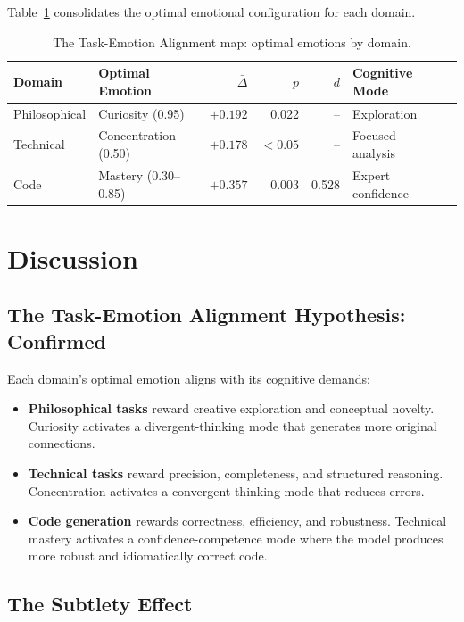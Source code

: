 \documentclass[lineno]{wlpeerj}
\begin{document}
Table~\ref{tab:alignment} consolidates the optimal emotional configuration for each domain.

\begin{table}[H]
\centering
\caption{The Task-Emotion Alignment map: optimal emotions by domain.}
\label{tab:alignment}
\begin{tabular}{@{}llrrrll@{}}
\toprule
\textbf{Domain} & \textbf{Optimal Emotion} & $\bar{\Delta}$ & $p$ & $d$ & \textbf{Cognitive Mode} \\
\midrule
Philosophical & Curiosity (0.95) & $+0.192$ & 0.022 & -- & Exploration \\
Technical & Concentration (0.50) & $+0.178$ & ${<}0.05$ & -- & Focused analysis \\
Code & Mastery (0.30--0.85) & $+0.357$ & 0.003 & 0.528 & Expert confidence \\
\bottomrule
\end{tabular}
\end{table}

\section{Discussion}

\subsection{The Task-Emotion Alignment Hypothesis: Confirmed}

Each domain's optimal emotion aligns with its cognitive demands:
\begin{itemize}
    \item \textbf{Philosophical tasks} reward creative exploration and conceptual novelty. Curiosity activates a divergent-thinking mode that generates more original connections.
    \item \textbf{Technical tasks} reward precision, completeness, and structured reasoning. Concentration activates a convergent-thinking mode that reduces errors.
    \item \textbf{Code generation} rewards correctness, efficiency, and robustness. Technical mastery activates a confidence-competence mode where the model produces more robust and idiomatically correct code.
\end{itemize}

\subsection{The Subtlety Effect}
\end{document}
